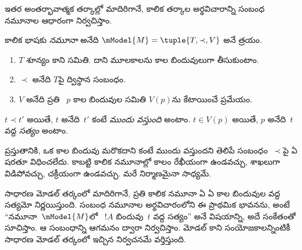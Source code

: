 \documentclass[../../../include/open-logic-section]{subfiles}
\begin{document}
ఇతర అంతర్భావాత్మక తర్కాల్లో మాదిరిగానే, కాలిక తర్కాల
అర్థవిచారాన్ని సంబంధ నమూనాల ఆధారంగా నిర్వచిస్తాం.

\begin{defn}
  కాలిక భాషకు \emph{నమూనా} అనేది
  $\mModel{M} = \tuple{T, \prec, V}$ అనే త్రయం.
  \begin{enumerate}
  \item $T$ శూన్యం కాని సమితి. దాని మూలకాలను కాల
    బిందువులుగా తీసుకుంటాం.
  \item $\prec$ అనేది $T$పై ద్విస్థాన సంబంధం.
  \item $V$ అనేది ప్రతి ~$p$ కాల బిందువుల
    సమితి $V(p)$ను కేటాయించే ప్రమేయం.
  \end{enumerate}
  $t \prec t'$ అయితే, $t$ అనేది~$t'$ కంటే
  \emph{ముందు వస్తుంది} అంటాం.
  $t \in V(p)$ అయితే, $p$ అనేది~$t$ వద్ద
  \emph{సత్యం} అంటాం.
\end{defn}

ప్రస్తుతానికి, ఒక కాల బిందువు మరొకదాని కంటే ముందు
వస్తుందని తెలిపే సంబంధం~$\prec$పై ఏ షరతూ విధించలేదు.
కాబట్టి కాలిక నమూనాల్లో కాలం రేఖీయంగా ఉండవచ్చు, శాఖలుగా
విడిపోవచ్చు, చక్రీయంగా ఉండవచ్చు. మరే నిర్మాణమైనా సాధ్యమే.

సాధారణ మోడల్ తర్కంలో మాదిరిగానే, ప్రతి కాలిక నమూనా ఏ
 ఏ కాల బిందువుల వద్ద సత్యమో
నిర్ణయిస్తుంది. సంబంధ నమూనాల అర్థవిచారంలోని ఈ ప్రాథమిక
భావనను, అంటే ``నమూనా~$\mModel{M}$లో
~$!A$ బిందువు~$t$ వద్ద
సత్యం'' అనే విషయాన్ని, అదే సంకేతంతో సూచిస్తాం. ఆ సంబంధాన్ని
ఆగమనం ద్వారా నిర్వచిస్తాం. మోడల్ కాని సంయోజకాలన్నింటికీ
సాధారణ మోడల్ తర్కంలో ఇచ్చిన నిర్వచనమే వర్తిస్తుంది.
\end{document}
